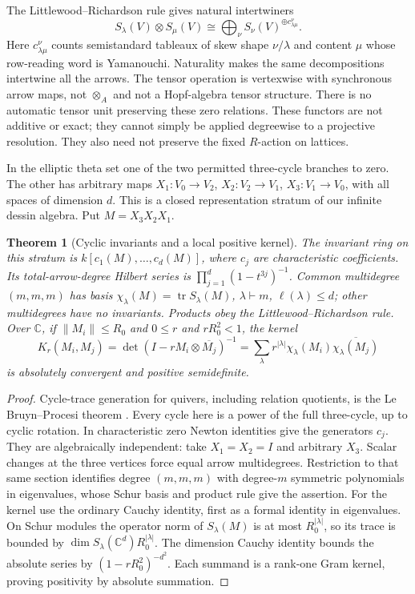 \documentclass[11pt,oneside,openany]{book}
\newtheorem{theorem}{Theorem}[chapter]
\theoremstyle{definition}\newtheorem{definition}[theorem]{Definition}
\theoremstyle{remark}\newtheorem{remark}[theorem]{Remark}
\newcommand{\C}{\mathbb C}\newcommand{\Z}{\mathbb Z}\newcommand{\R}{\mathbb R}
\DeclareMathOperator{\tr}{tr}\DeclareMathOperator{\Rea}{Re}
\begin{document}
The Littlewood--Richardson rule gives natural intertwiners
\[
 S_\lambda(V)\otimes S_\mu(V)\cong
 \bigoplus_\nu S_\nu(V)^{\oplus c_{\lambda\mu}^{\nu}}.
\]
Here $c_{\lambda\mu}^{\nu}$ counts semistandard tableaux of skew shape $\nu/\lambda$ and content $\mu$ whose row-reading word is Yamanouchi. Naturality makes the same decompositions intertwine all the arrows. The tensor operation is vertexwise with synchronous arrow maps, not $\otimes_A$ and not a Hopf-algebra tensor structure. There is no automatic tensor unit preserving these zero relations. These functors are not additive or exact; they cannot simply be applied degreewise to a projective resolution. They also need not preserve the fixed $R$-action on lattices.

In the elliptic theta set one of the two permitted three-cycle branches to zero. The other has arbitrary maps $X_1:V_0\to V_2$, $X_2:V_2\to V_1$, $X_3:V_1\to V_0$, with all spaces of dimension $d$. This is a closed representation stratum of our infinite dessin algebra. Put $M=X_3X_2X_1$.
\begin{theorem}[Cyclic invariants and a local positive kernel]\label{thm:schur}
The invariant ring on this stratum is $k[c_1(M),\ldots,c_d(M)]$, where $c_j$ are characteristic coefficients. Its total-arrow-degree Hilbert series is $\prod_{j=1}^d(1-t^{3j})^{-1}$. Common multidegree $(m,m,m)$ has basis $\chi_\lambda(M)=\tr S_\lambda(M)$, $\lambda\vdash m$, $\ell(\lambda)\le d$; other multidegrees have no invariants. Products obey the Littlewood--Richardson rule. Over $\C$, if $\|M_i\|\le R_0$ and $0\le r$ and $rR_0^2<1$, the kernel
\[
 K_r(M_i,M_j)=\det(I-rM_i\otimes\overline{M_j})^{-1}
 =\sum_\lambda r^{|\lambda|}\chi_\lambda(M_i)\overline{\chi_\lambda(M_j)}
\]
is absolutely convergent and positive semidefinite.
\end{theorem}
\begin{proof}
Cycle-trace generation for quivers, including relation quotients, is the Le Bruyn--Procesi theorem \cite{LeBruynProcesi,CrawYamagishi}. Every cycle here is a power of the full three-cycle, up to cyclic rotation. In characteristic zero Newton identities give the generators $c_j$. They are algebraically independent: take $X_1=X_2=I$ and arbitrary $X_3$. Scalar changes at the three vertices force equal arrow multidegrees. Restriction to that same section identifies degree $(m,m,m)$ with degree-$m$ symmetric polynomials in eigenvalues, whose Schur basis and product rule give the assertion. For the kernel use the ordinary Cauchy identity, first as a formal identity in eigenvalues. On Schur modules the operator norm of $S_\lambda(M)$ is at most $R_0^{|\lambda|}$, so its trace is bounded by $\dim S_\lambda(\C^d)R_0^{|\lambda|}$. The dimension Cauchy identity bounds the absolute series by $(1-rR_0^2)^{-d^2}$. Each summand is a rank-one Gram kernel, proving positivity by absolute summation.
\end{proof}
\end{document}
